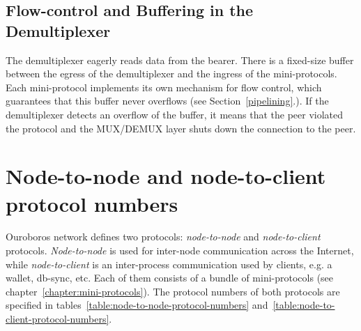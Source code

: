 \subsection{Flow-control and Buffering in the Demultiplexer}
\label{mux-flow-control}
The demultiplexer eagerly reads data from the bearer.
There is a fixed-size buffer between the egress of the demultiplexer and the ingress of
the mini-protocols.
Each mini-protocol implements its own mechanism for flow control, which guarantees that this buffer
never overflows (see Section~\ref{pipelining}.).
If the demultiplexer detects an overflow of the buffer, it means that the peer violated the
protocol and the MUX/DEMUX layer shuts down the connection to the peer.


\section{Node-to-node and node-to-client protocol numbers}
\noindent{}
\newline{}
\newline{}

Ouroboros network defines two protocols: \emph{node-to-node} and
\emph{node-to-client} protocols.  \emph{Node-to-node} is used for inter-node
communication across the Internet, while \emph{node-to-client} is an inter-process communication used by clients, e.g. a wallet, db-sync, etc.  Each of them consists of a bundle of mini-protocols (see chapter~\ref{chapter:mini-protocols}).
The protocol numbers of both protocols
are specified in tables~\ref{table:node-to-node-protocol-numbers}
and~\ref{table:node-to-client-protocol-numbers}.

